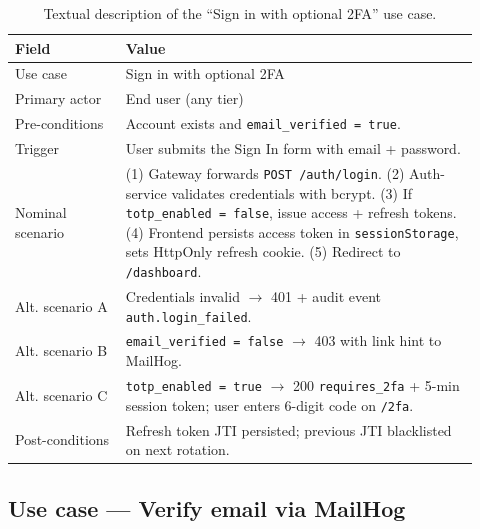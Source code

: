 \documentclass[12pt, a4paper, oneside]{report}
\begin{document}
\begin{table}[H]
\centering
\caption{Textual description of the ``Sign in with optional 2FA'' use case.}
\label{tab:uc_signin}
\begin{tabular}{|p{0.22\linewidth}|L{0.7\linewidth}|}
\hline
\textbf{Field} & \textbf{Value} \\
\hline
Use case & Sign in with optional 2FA \\ \hline
Primary actor & End user (any tier) \\ \hline
Pre-conditions & Account exists and \texttt{email\_verified = true}. \\ \hline
Trigger & User submits the Sign In form with email + password. \\ \hline
Nominal scenario & (1) Gateway forwards \texttt{POST /auth/login}.
(2) Auth-service validates credentials with bcrypt.
(3) If \texttt{totp\_enabled = false}, issue access + refresh tokens.
(4) Frontend persists access token in \texttt{sessionStorage}, sets HttpOnly refresh cookie.
(5) Redirect to \texttt{/dashboard}. \\ \hline
Alt. scenario A & Credentials invalid $\to$ 401 + audit event \texttt{auth.login\_failed}. \\ \hline
Alt. scenario B & \texttt{email\_verified = false} $\to$ 403 with link hint to MailHog. \\ \hline
Alt. scenario C & \texttt{totp\_enabled = true} $\to$ 200 \texttt{requires\_2fa} + 5-min session token; user enters 6-digit code on \texttt{/2fa}. \\ \hline
Post-conditions & Refresh token JTI persisted; previous JTI blacklisted on next rotation. \\
\hline
\end{tabular}
\end{table}

\subsection{Use case --- Verify email via MailHog}
\end{document}

